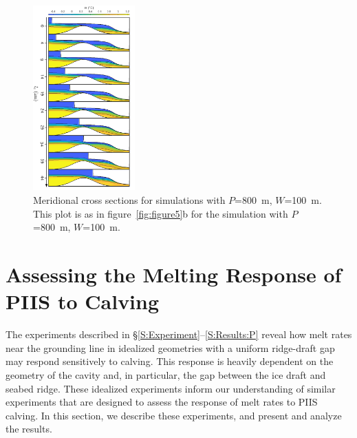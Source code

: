 \documentclass[draft]{agujournal2019}
\begin{document}
\begin{figure}
    \centering
    \includegraphics[width = 0.35\textwidth]{../make_figures/plots/figure9.pdf}
    \caption{Meridional cross sections for simulations with $P$=800~m, $W$=100~m. This plot is as in figure~\ref{fig:figure5}b for the simulation with $P$=800~m, $W$=100~m. }
    \label{fig:figure9}
\end{figure}

\section{Assessing the Melting Response of PIIS to Calving}\label{S:Realistic}
The experiments described in \S\ref{S:Experiment}--\ref{S:Results:P} reveal how melt rates near the grounding line in idealized geometries with a uniform ridge-draft gap may respond sensitively to calving. This response is heavily dependent on the geometry of the cavity and, in particular, the gap between the ice draft and seabed ridge. These idealized experiments inform our understanding of similar experiments that are designed to assess the response of melt rates to PIIS calving. In this section, we describe these experiments, and present and analyze the results.
\end{document}
